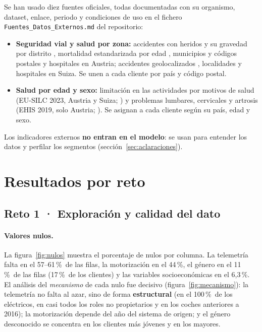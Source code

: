 \documentclass[11pt,a4paper]{article}
\newcommand{\pct}{\,\%}
\begin{document}
Se han usado diez fuentes oficiales, todas documentadas con su organismo, dataset, enlace, periodo y condiciones de uso
en el fichero \texttt{Fuentes\_Datos\_Externos.md} del repositorio:
\begin{itemize}
  \item \textbf{Seguridad vial y salud por zona:} accidentes con heridos y su gravedad por distrito
        \parencite{statat2025}, mortalidad estandarizada por edad \parencite{statatmort}, municipios y códigos postales
        \parencite{statatgem} y hospitales \parencite{bmsgpk2026} en Austria; accidentes geolocalizados
        \parencite{astra2026}, localidades \parencite{swisstopo2026} y hospitales \parencite{bag2023} en Suiza. Se unen
        a cada cliente por país y código postal.
  \item \textbf{Salud por edad y sexo:} limitación en las actividades por motivos de salud (EU-SILC 2023, Austria y
        Suiza; \cite{eurostatsilc}) y problemas lumbares, cervicales y artrosis (EHIS 2019, solo Austria;
        \cite{eurostatehis}). Se asignan a cada cliente según su país, edad y sexo.
\end{itemize}
Los indicadores externos \textbf{no entran en el modelo}: se usan para entender los datos y perfilar los segmentos
(sección~\ref{sec:aclaraciones}).

\section{Resultados por reto}\label{sec:resultados}

\subsection{Reto 1 · Exploración y calidad del dato}\label{sec:r1}

\paragraph{Valores nulos.} La figura~\ref{fig:nulos} muestra el porcentaje de nulos por columna. La telemetría falta en
el 57--61\pct\ de las filas, la motorización en el 44\pct, el género en el 11\pct\ de las filas (17\pct\ de los
clientes) y las variables socioeconómicas en el 6,3\pct. El análisis del \emph{mecanismo} de cada nulo
\parencite{little2019} fue decisivo (figura~\ref{fig:mecanismo}): la telemetría no falta al azar, sino de forma
\textbf{estructural} (en el 100\pct\ de los eléctricos, en casi todos los roles no propietarios y en los coches
anteriores a 2016); la motorización depende del año del sistema de origen; y el género desconocido se concentra en los
clientes más jóvenes y en los mayores.
\end{document}
